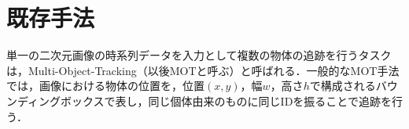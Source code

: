 \section{既存手法}

単一の二次元画像の時系列データを入力として複数の物体の追跡を行うタスクは，Multi-Object-Tracking（以後MOTと呼ぶ）と呼ばれる．一般的なMOT手法では，画像における物体の位置を，位置$(x,y)$，幅$w$，高さ$h$で構成されるバウンディングボックスで表し，同じ個体由来のものに同じIDを振ることで追跡を行う．